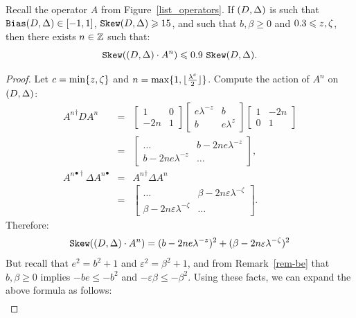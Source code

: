 \begin{lemma}
\label{lemmaA}
Recall the operator $A$ from Figure~\ref{list_operators}. 
If $(D,\Delta) $ is such that $\mathtt{Bias}(D,\Delta)
\in[-1,1]$, $\sk\state\geq\formula{\P}$, and such that
$b,\beta\geq 0$ and $\formula{-\a}\leq{z},\zeta$,
then there exists $n\in \mathbb{Z}$ 
such that:
\[
  \sk(\state \cdot A^n) 
  \leq \formula{\Qstep}~\sk\state . 
\]
\end{lemma}

\begin{proof}
Let $c=\min\{{z},{\zeta}\}$ and 
$n=\max\{1, \lfloor\frac{\lambda^{c}}{2}\rfloor\}$.
Compute the action of $A^{n}$ on $(D,\Delta)$:
\[
  \begin{array}{lcl}
    {A^{n}}^\dagger DA^{n} & = & 
    \left[\begin{array} {cc} 
      1 & 0  \\
      -2n & 1
    \end{array}\right]
    \left[ \begin{array} {cc} 
      e{\lambda^{-z}} & b \\
      b & e{\lambda^{z}}
    \end{array}\right]
    \left[ \begin{array} {cc} 
      1 & -2n  \\
      0 & 1
    \end{array}\right] \\[9pt]
    & = & \left[\begin{array} {cc} 
      \ldots & b-2ne{\lambda^{-z}}  \\
      b-2ne{\lambda^{-z}} & \ldots
    \end{array} \right], \\[18pt]
    {A^{n}}^{\bullet\dagger}
      \Delta{A^{n}}^\bullet 
    & = & {A^{n}}^\dagger \Delta A^{n} \\
    & = & \left[ \begin{array} {cc} 
      \ldots & \beta-2n\varepsilon{\lambda^{-\zeta}}  \\
      \beta-2n\varepsilon{\lambda^{-\zeta}} & \ldots
    \end{array} \right].
  \end{array}
\]
Therefore:
\[
\mathtt{Skew}((D,\Delta) \cdot A^{n}) = 
(b-2ne{\lambda^{-z}})^2+(\beta-2n\varepsilon{\lambda^{-\zeta}})^2
\]
But recall that $e^2=b^2+1$ and
$\varepsilon^2=\beta^2+1$, and from Remark~\ref{rem-be} that 
$b,\beta\geq 0$ implies $-be\leq -b^2$ and 
$-\varepsilon\beta\leq -\beta^2$. Using these 
facts, we can expand the above formula as 
follows:
\begin{eqnarray}

\end{eqnarray}
\end{proof}
